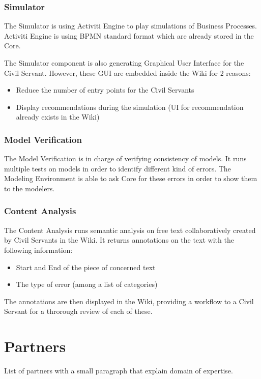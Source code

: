 \documentclass{learnpad}
\begin{document}
\subsection{Simulator}
The Simulator is using Activiti Engine to play simulations of Business
Processes.  Activiti Engine is using BPMN standard format which are already
stored in the \learnpad Core.

The Simulator component is also generating Graphical User Interface for the
Civil Servant.  However, these GUI are embedded inside the Wiki for 2 reasons:
\begin{itemize}
	\item Reduce the number of entry points for the Civil Servants
	\item Display recommendations during the simulation (UI for recommendation
		already exists in the Wiki)
\end{itemize}

\subsection{Model Verification}
The Model Verification is in charge of verifying consistency of models.  It 
runs multiple tests on models in order to identify different kind of errors.  The
Modeling Environment is able to ask \learnpad Core for these errors in order to
show them to the modelers.

\subsection{Content Analysis}
The Content Analysis runs semantic analysis on free text collaboratively created
by Civil Servants in the Wiki.  It returns annotations on the text with the
following information:
\begin{itemize}
	\item Start and End of the piece of concerned text
	\item The type of error (among a list of categories)
\end{itemize}

The annotations are then displayed in the Wiki, providing a workflow to a Civil
Servant for a throrough review of each of these.

\chapter{Partners}
\label{ch:partners}
List of partners with a small paragraph that explain domain of expertise.







% 
% 
\end{document}
